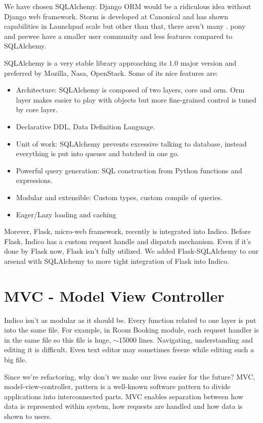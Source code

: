We have chosen SQLAlchemy. Django ORM would be a ridiculous idea without Django web framework. Storm is developed at Canonical and has shown capabilities in Launchpad scale but other than that, there aren't many . pony and peewee have a smaller user community and less features compared to SQLAlchemy.

SQLAlchemy is a very stable library approaching its $1.0$ major version and preferred by Mozilla, Nasa, OpenStack. Some of its nice features are:
\begin{itemize}
  \item Architecture: SQLAlchemy is composed of two layers, core and orm. Orm layer makes easier to play with objects but more fine-grained control is tuned by core layer.
  \item Declarative DDL, Data Definition Language.
  \item Unit of work: SQLAlchemy prevents excessive talking to database, instead everything is put into queues and batched in one go.
  \item Powerful query generation: SQL construction from Python functions and expressions.
  \item Modular and extensible: Custom types, custom compile of queries.
  \item Eager/Lazy loading and caching
\end{itemize}

Morever, Flask, micro-web framework, recently is integrated into Indico. Before Flask, Indico has a custom request handle and dispatch mechanism. Even if it's done by Flask now, Flask isn't fully utilized. We added Flask-SQLAlchemy to our arsenal with SQLAlchemy to more tight integration of Flask into Indico.

\section{MVC - Model View Controller}

Indico isn't as modular as it should be. Every function related to one layer is put into the same file. For example, in Room Booking module, each request handler is in the same file so this file is huge, $\sim$15000 lines. Navigating, understanding and editing it is difficult. Even text editor may sometimes freeze while editing such a big file.

Since we're refactoring, why don't we make our lives easier for the future? MVC, model-view-controller, pattern is a well-known software pattern to divide applications into interconnected parts. MVC enables separation between how data is represented within system, how requests are handled and how data is shown to users.

